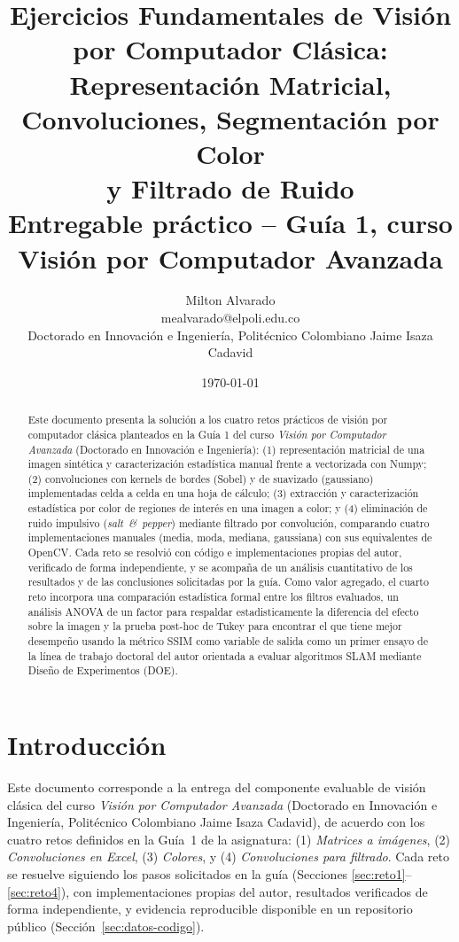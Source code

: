 \documentclass[11pt]{article}
\title{Ejercicios Fundamentales de Visión por Computador Clásica:\\
Representación Matricial, Convoluciones, Segmentación por Color\\
y Filtrado de Ruido\\
\large Entregable práctico -- Guía 1, curso Visión por Computador Avanzada}
\author{Milton Alvarado \\ \small mealvarado@elpoli.edu.co \\
\small Doctorado en Innovación e Ingeniería, Politécnico Colombiano Jaime Isaza Cadavid}
\date{\today}
\begin{document}
\maketitle

\begin{abstract}
Este documento presenta la solución a los cuatro retos prácticos de visión
por computador clásica planteados en la Guía 1 del curso \emph{Visión por
Computador Avanzada} (Doctorado en Innovación e Ingeniería): (1)
representación matricial de una imagen sintética y caracterización
estadística manual frente a vectorizada con Numpy; (2) convoluciones con
kernels de bordes (Sobel) y de suavizado (gaussiano) implementadas celda a
celda en una hoja de cálculo; (3) extracción y caracterización estadística
por color de regiones de interés en una imagen a color; y (4) eliminación
de ruido impulsivo (\emph{salt~\&~pepper}) mediante filtrado por
convolución, comparando cuatro implementaciones manuales (media, moda,
mediana, gaussiana) con sus equivalentes de OpenCV. Cada reto se resolvió
con código e implementaciones propias del autor, verificado de forma
independiente, y se acompaña de un análisis cuantitativo de los resultados
y de las conclusiones solicitadas por la guía. Como valor agregado, el
cuarto reto incorpora una comparación estadística formal entre los filtros evaluados, un análisis ANOVA  de un
factor para respaldar estadisticamente la diferencia del efecto sobre la imagen y la prueba post-hoc de Tukey para encontrar el que tiene mejor desempeño usando la métrico SSIM como variable de salida como un primer
ensayo de la línea de trabajo doctoral del autor orientada a evaluar
algoritmos SLAM mediante Diseño de Experimentos (DOE).
\end{abstract}

\section{Introducción}
Este documento corresponde a la entrega del componente evaluable de visión
clásica del curso \emph{Visión por Computador Avanzada} (Doctorado en
Innovación e Ingeniería, Politécnico Colombiano Jaime Isaza Cadavid), de
acuerdo con los cuatro retos definidos en la Guía~1 de la asignatura: (1)
\emph{Matrices a imágenes}, (2) \emph{Convoluciones en Excel}, (3)
\emph{Colores}, y (4) \emph{Convoluciones para filtrado}. Cada reto se
resuelve siguiendo los pasos solicitados en la guía (Secciones
\ref{sec:reto1}--\ref{sec:reto4}), con implementaciones propias del autor,
resultados verificados de forma independiente, y evidencia reproducible
disponible en un repositorio público (Sección~\ref{sec:datos-codigo}).
\end{document}
